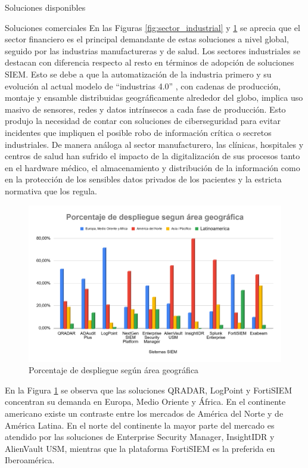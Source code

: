 \begin{section}{Soluciones disponibles}
\begin{subsection}{Soluciones comerciales}
        En las Figuras \ref{fig:sector_industrial} y \ref{fig:area_geografica_mundial} se aprecia que el sector financiero es el principal demandante de estas soluciones a nivel global, seguido por las industrias manufactureras y de salud. Los sectores industriales se destacan con diferencia respecto al resto en términos de adopción de soluciones SIEM. Esto se debe a que la automatización de la industria primero y su evolución al actual modelo de “industrias 4.0” \cite{industrias_4}, con cadenas de producción, montaje y ensamble distribuidas geográficamente alrededor del globo, implica uso masivo de sensores, redes y datos intrínsecos a cada fase de producción. Esto produjo la necesidad de contar con soluciones de ciberseguridad para evitar incidentes que impliquen el posible robo de información crítica o secretos industriales. De manera análoga al sector manufacturero, las clínicas, hospitales \cite{CCN_CERT} y centros de salud han sufrido el impacto de la digitalización de sus procesos tanto en el hardware médico, el almacenamiento y distribución de la información como en la protección de los sensibles datos privados de los pacientes y la estricta normativa que los regula. \par
        \begin{figure}[H]
            \centering
            \includegraphics[width=1\textwidth]{./marco_teorico_imagenes/figura_11_porcentaje_area_geografica.png}
            \caption{Porcentaje de despliegue según área geográfica}
            \label{fig:area_geografica_mundial}
        \end{figure}
        \FloatBarrier
        \vspace{-0,5cm}
        En la Figura \ref{fig:area_geografica_mundial} se observa que las soluciones QRADAR\cite{qradar}, LogPoint\cite{logpoint} y FortiSIEM\cite{fortisiem} concentran su demanda en Europa, Medio Oriente y África. En el continente americano existe un contraste entre los mercados de América del Norte y de América Latina. En el norte del continente la mayor parte del mercado es atendido por las soluciones de Enterprise Security Manager\cite{enterprise}, InsightIDR\cite{insight} y AlienVault USM\cite{alienvault_usm}, mientras que la plataforma FortiSIEM es la preferida en Iberoamérica. \par

\end{subsection}
\end{section}
